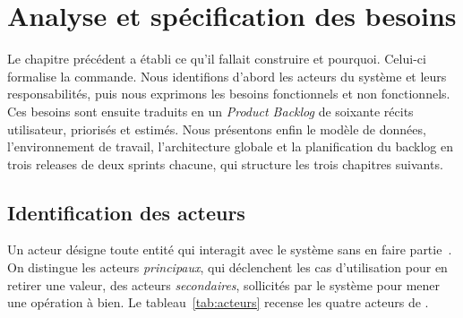 \chapter{Analyse et spécification des besoins}
\label{chap:analyse}


Le chapitre précédent a établi ce qu'il fallait construire et pourquoi. Celui-ci
formalise la commande. Nous identifions d'abord les acteurs du système et leurs
responsabilités, puis nous exprimons les besoins fonctionnels et non fonctionnels. Ces
besoins sont ensuite traduits en un \emph{Product Backlog} de soixante récits
utilisateur, priorisés et estimés. Nous présentons enfin le modèle de données,
l'environnement de travail, l'architecture globale et la planification du backlog en trois
releases de deux sprints chacune, qui structure les trois chapitres suivants.

\section{Identification des acteurs}

Un acteur désigne toute entité qui interagit avec le système sans en faire
partie~\cite{omg2017uml}. On
distingue les acteurs \emph{principaux}, qui déclenchent les cas d'utilisation pour en
retirer une valeur, des acteurs \emph{secondaires}, sollicités par le système pour
mener une opération à bien. Le tableau~\ref{tab:acteurs} recense les quatre acteurs de
\hypnoria{}.

